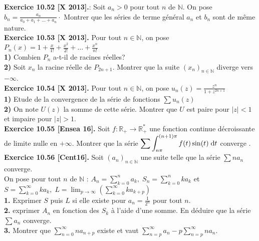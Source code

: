 \documentclass[a4paper,12pt,francais]{article}
\newcommand{\field}[1]{\mathbb{#1}}
\newcommand{\N}{\field{N}}
\newcommand{\R}{\field{R}}
\newcommand{\e}{\mbox{e}}
\begin{document}
\noindent
{\bf Exercice 10.52 [X 2013].}: Soit $a_n>0$ pour tout $n$ de $\N$. On pose $b_n =\frac{a_n}{a_0+a_1+\dots +a_n} \cdot$ 
Montrer que les séries de terme général $a_n$ et $b_n$ sont de même nature.\\

\noindent
{\bf Exercice 10.53 [X 2013].} Pour tout $n\in \N$, on pose $P_n(x)=1+\frac{x}{1!}+\frac{x^2}{2!}+\dots+\frac{x^n}{n!}$\\
{\bf 1)} Combien $P_n$ a-t-il de racines réelles?\\
{\bf 2)} Soit $x_n$ la racine réelle de $P_{2n+1}$. Montrer que la suite $(x_n)_{n \in \N}$ diverge vers $-\infty$.\\

\noindent
{\bf Exercice 10.54 [X 2013].} Pour tout $n\in \N$, on pose $u_n(z)=\frac{z^n}{1+z^{2n+1}}$\\
{\bf 1)} Etude de la convergence de la série de fonctions $\sum u_n(z)$\\
{\bf 2)} On note $U(z)$ la somme de cette série. Montrer que $U$ est paire pour $|z|<1$ et impaire pour $|z|>1$.\\

\noindent
{\bf Exercice 10.55 [Ensea 16].} %
Soit $f:\R_+ \to \R_+^*$ une fonction continue décroissante de limite nulle en $+\infty$. Montrer que la série $\displaystyle \sum \int_{n\pi}^{(n+1)\pi} f(t) \sin (t) \; {\rm d}t$ converge .\\

\noindent
{\bf Exercice 10.56 [Cent16].} %
Soit $(a_n)_{n \in \N}$ une suite telle que la série $\sum n a_n$ converge.\\
On pose pour tout $n$ de $\N$ : $\displaystyle 
A_n=\sum_{k=0}^n a_k, \;  
S_n=\sum_{k=0}^n k a_k$ et $\displaystyle 
S=\sum_{k=0}^\infty k a_k, \; 
L=\lim_{p \to \infty} \left( \sum_{k=0}^\infty k a_{k+p} \right)$\\
{\bf 1.} Exprimer $S$ puis $L$ si elle existe pour $a_n=\frac{1}{2^n}$ pour tout $n$.\\
{\bf 2.} exprimer $A_n$ en fonction des $S_k$ à l'aide d'une somme. En déduire que la série $\sum a_n$ converge.\\
{\bf 3.} Montrer que $\displaystyle \sum_{n=0}^\infty n a_{n+p}$ existe et vaut $\displaystyle \sum_{n=p}^\infty a_{n}-p \sum_{n=p}^\infty n a_{n}$.\\    



\end{document}
